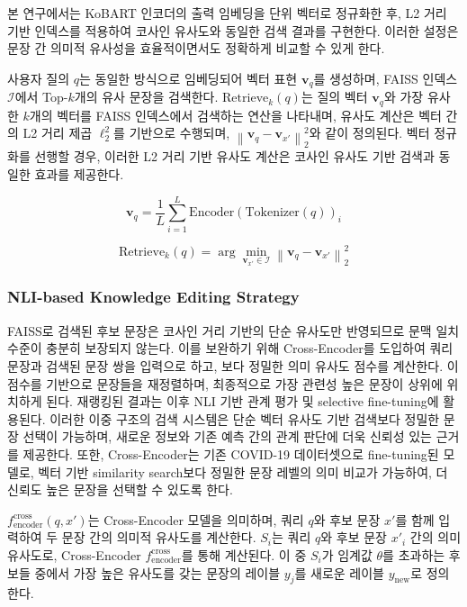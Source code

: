 \documentclass[a4paper,fleqn]{cas-sc}
\begin{document}
본 연구에서는 KoBART 인코더의 출력 임베딩을 단위 벡터로 정규화한 후, L2 거리 기반 인덱스를 적용하여 코사인 유사도와 동일한 검색 결과를 구현한다. 
이러한 설정은 문장 간 의미적 유사성을 효율적이면서도 정확하게 비교할 수 있게 한다.

사용자 질의 \( q \)는 동일한 방식으로 임베딩되어 벡터 표현 \( \mathbf{v}_q \)를 생성하며, FAISS 인덱스 \( \mathcal{I} \)에서 Top-\(k\)개의 유사 문장을 검색한다.
\( \mathrm{Retrieve}_k(q) \)는 질의 벡터 \( \mathbf{v}_q \)와 가장 유사한 \( k \)개의 벡터를 FAISS 인덱스에서 검색하는 연산을 나타내며, 유사도 계산은 벡터 간의 L2 거리 제곱 \( \ell_2^2 \)를 기반으로 수행되며,  \( \left\| \mathbf{v}_q - \mathbf{v}_{x'} \right\|_2^2 \)와 같이 정의된다.  
벡터 정규화를 선행할 경우, 이러한 L2 거리 기반 유사도 계산은 코사인 유사도 기반 검색과 동일한 효과를 제공한다.

\begin{equation}
    \mathbf{v}_q = \frac{1}{L} \sum_{i=1}^{L} \mathrm{Encoder}(\mathrm{Tokenizer}(q))_i
\end{equation}

\begin{equation}
    \mathrm{Retrieve}_k(q) = \arg\min_{\mathbf{v}_{x'} \in \mathcal{I}} \left\| \mathbf{v}_q - \mathbf{v}_{x'} \right\|_2^2
\end{equation}

\subsubsection{NLI-based Knowledge Editing Strategy}
FAISS로 검색된 후보 문장은 코사인 거리 기반의 단순 유사도만 반영되므로 문맥 일치 수준이 충분히 보장되지 않는다. 
이를 보완하기 위해 Cross-Encoder를 도입하여 쿼리 문장과 검색된 문장 쌍을 입력으로 하고, 보다 정밀한 의미 유사도 점수를 계산한다. 
이 점수를 기반으로 문장들을 재정렬하며, 최종적으로 가장 관련성 높은 문장이 상위에 위치하게 된다. 재랭킹된 결과는 이후 NLI 기반 관계 평가 및 selective fine-tuning에 활용된다.
이러한 이중 구조의 검색 시스템은 단순 벡터 유사도 기반 검색보다 정밀한 문장 선택이 가능하며, 새로운 정보와 기존 예측 간의 관계 판단에 더욱 신뢰성 있는 근거를 제공한다. 
또한, Cross-Encoder는 기존 COVID-19 데이터셋으로 fine-tuning된 모델로, 벡터 기반 similarity search보다 정밀한 문장 레벨의 의미 비교가 가능하여, 더 신뢰도 높은 문장을 선택할 수 있도록 한다. 

$f_{\text{encoder}}^{\text{cross}}(q, x')$는 Cross-Encoder 모델을 의미하며, 쿼리 $q$와 후보 문장 $x'$를 함께 입력하여 두 문장 간의 의미적 유사도를 계산한다.
$S_i$는 쿼리 $q$와 후보 문장 $x'_i$ 간의 의미 유사도로, Cross-Encoder $f_{\text{encoder}}^{\text{cross}}$를 통해 계산된다. 
이 중 $S_i$가 임계값 $\theta$를 초과하는 후보들 중에서 가장 높은 유사도를 갖는 문장의 레이블 $y_j$를 새로운 레이블 $y_{\text{new}}$로 정의한다.
\end{document}
